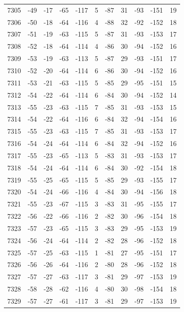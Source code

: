 \begin{table}[H]
\begin{tabular}{lllllllllll}
7305 & -49 & -17 & -65 & -117 & 5 & -87 & 31 & -93 & -151 & 19 \\
7306 & -50 & -18 & -64 & -116 & 4 & -88 & 32 & -92 & -152 & 18 \\
7307 & -51 & -19 & -63 & -115 & 5 & -87 & 31 & -93 & -153 & 17 \\
7308 & -52 & -18 & -64 & -114 & 4 & -86 & 30 & -94 & -152 & 16 \\
7309 & -53 & -19 & -63 & -113 & 5 & -87 & 29 & -93 & -151 & 17 \\
7310 & -52 & -20 & -64 & -114 & 6 & -86 & 30 & -94 & -152 & 16 \\
7311 & -53 & -21 & -63 & -115 & 5 & -85 & 29 & -95 & -151 & 15 \\
7312 & -54 & -22 & -64 & -114 & 6 & -84 & 30 & -94 & -152 & 14 \\
7313 & -55 & -23 & -63 & -115 & 7 & -85 & 31 & -93 & -153 & 15 \\
7314 & -54 & -22 & -64 & -116 & 6 & -84 & 32 & -94 & -154 & 16 \\
7315 & -55 & -23 & -63 & -115 & 7 & -85 & 31 & -93 & -153 & 17 \\
7316 & -54 & -24 & -64 & -114 & 6 & -84 & 32 & -94 & -152 & 16 \\
7317 & -55 & -23 & -65 & -113 & 5 & -83 & 31 & -93 & -153 & 17 \\
7318 & -54 & -24 & -64 & -114 & 6 & -84 & 30 & -92 & -154 & 18 \\
7319 & -55 & -25 & -65 & -115 & 5 & -85 & 29 & -93 & -155 & 17 \\
7320 & -54 & -24 & -66 & -116 & 4 & -84 & 30 & -94 & -156 & 18 \\
7321 & -55 & -23 & -67 & -115 & 3 & -83 & 31 & -95 & -155 & 17 \\
7322 & -56 & -22 & -66 & -116 & 2 & -82 & 30 & -96 & -154 & 18 \\
7323 & -57 & -23 & -65 & -115 & 3 & -83 & 29 & -95 & -153 & 19 \\
7324 & -56 & -24 & -64 & -114 & 2 & -82 & 28 & -96 & -152 & 18 \\
7325 & -57 & -25 & -63 & -115 & 1 & -81 & 27 & -95 & -151 & 17 \\
7326 & -56 & -26 & -64 & -116 & 2 & -80 & 28 & -96 & -152 & 18 \\
7327 & -57 & -27 & -63 & -117 & 3 & -81 & 29 & -97 & -153 & 19 \\
7328 & -58 & -28 & -62 & -116 & 4 & -80 & 30 & -98 & -154 & 18 \\
7329 & -57 & -27 & -61 & -117 & 3 & -81 & 29 & -97 & -153 & 19 \\

\end{tabular}
\end{table}
